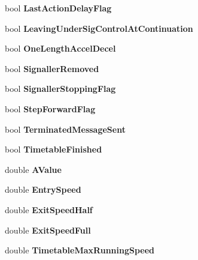 \begin{DoxyCompactItemize}
bool {\bfseries Last\+Action\+Delay\+Flag}
\item 
\mbox{\label{class_t_train_ac1ce3c1b548c1e4199d211b5fcd9763e}} 
bool {\bfseries Leaving\+Under\+Sig\+Control\+At\+Continuation}
\item 
\mbox{\label{class_t_train_a36dc9bd48fb78d4257fe117908829dd7}} 
bool {\bfseries One\+Length\+Accel\+Decel}
\item 
\mbox{\label{class_t_train_a4cd38ef44706b5ae6bf0c934e58b4b93}} 
bool {\bfseries Signaller\+Removed}
\item 
\mbox{\label{class_t_train_a559e8f1636c83d03463d6c901ae39567}} 
bool {\bfseries Signaller\+Stopping\+Flag}
\item 
\mbox{\label{class_t_train_a0f044ad19728cee6dd0b6baadec4648b}} 
bool {\bfseries Step\+Forward\+Flag}
\item 
\mbox{\label{class_t_train_aa714e9f320349edfe76fc9ac3ae3e20a}} 
bool {\bfseries Terminated\+Message\+Sent}
\item 
\mbox{\label{class_t_train_a9e3744afb10713ef0b88f6fabb120236}} 
bool {\bfseries Timetable\+Finished}
\item 
\mbox{\label{class_t_train_a49612fd01b9450008b99d9fd66ac7583}} 
double {\bfseries A\+Value}
\item 
\mbox{\label{class_t_train_ae132daaee23376980818479528f27e2f}} 
double {\bfseries Entry\+Speed}
\item 
\mbox{\label{class_t_train_a05c926d79cbda85036d8d746131c3aef}} 
double {\bfseries Exit\+Speed\+Half}
\item 
\mbox{\label{class_t_train_ab3de27e27b474c1f2d224f73735fc1c2}} 
double {\bfseries Exit\+Speed\+Full}
\item 
\mbox{\label{class_t_train_adc5921a57f31d66e9b22f040717716d4}} 
double {\bfseries Timetable\+Max\+Running\+Speed}
\item 

\end{DoxyCompactItemize}
